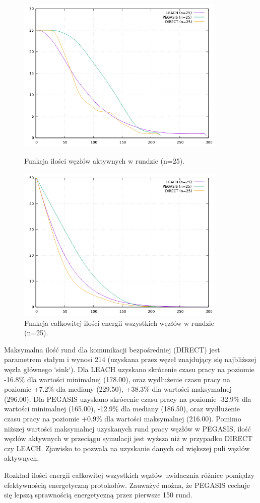 \documentclass[a4paper,12pt,twoside,openany]{report}
\begin{document}
\begin{figure}[H]
 \centering
 \includegraphics[width=10cm]{images/gnuplot/test_2/nodes_in_round_25.png}
 \caption{Funkcja ilości węzłów aktywnych w rundzie (n=25).}
 \includegraphics[width=10cm]{images/gnuplot/test_2/energy_in_round_25.png}
 \caption{Funkcja całkowitej ilości energii wszystkich węzłów w rundzie (n=25).}
\end{figure}

\par
Maksymalna ilość rund dla komunikacji bezpośredniej (DIRECT) jest parametrem stałym i wynosi 214 (uzyskana przez węzeł znajdujący się najbliższej węzła głównego `sink`).
Dla LEACH uzyskano skrócenie czasu pracy na poziomie -16.8\% dla wartości minimalnej (178.00), oraz wydłużenie czasu pracy na poziomie +7.2\% dla mediany (229.50), +38.3\% dla wartości maksymalnej (296.00).
Dla PEGASIS uzyskano skrócenie czasu pracy na poziomie -32.9\% dla wartości minimalnej (165.00), -12.9\% dla mediany (186.50), oraz wydłużenie czasu pracy na poziomie +0.9\% dla wartości maksymalnej (216.00).
Pomimo niższej wartości maksymalnej uzyskanych rund pracy węzłów w PEGASIS, ilość węzłów aktywnych w przeciągu symulacji jest wyższa niż w przypadku DIRECT czy LEACH.
Zjawisko to pozwala na uzyskanie danych od większej puli węzłów aktywnych.
\par
Rozkład ilości energii całkowitej wszystkich węzłów uwidacznia różnice pomiędzy efektywnością energetyczną protokołów.
Zauważyć można, że PEGASIS cechuje się lepszą sprawnością energetyczną przez pierwsze 150 rund.
\end{document}
